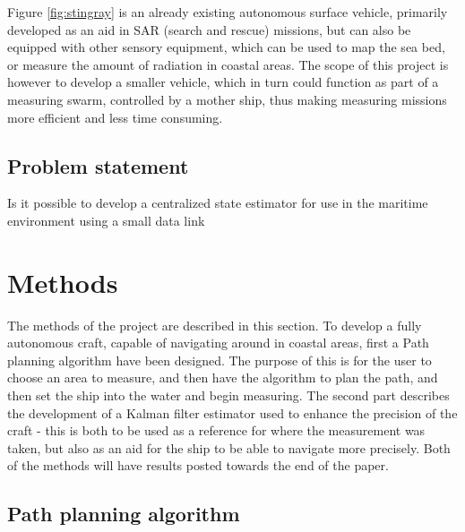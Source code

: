 \documentclass{ifacconf}
\begin{document}
Figure \ref{fig:stingray} is an already existing autonomous surface vehicle, primarily developed as an aid in SAR (search and rescue) missions, but can also be equipped with other sensory equipment, which can be used to map the sea bed, or measure the amount of radiation in coastal areas. The scope of this project is however to develop a smaller vehicle, which in turn could function as part of a measuring swarm, controlled by a mother ship, thus making measuring missions more efficient and less time consuming.

\subsection{Problem statement}
\begin{hypo} Is it possible to develop a centralized state estimator for use in the maritime environment using a small data link \end{hypo}

\section{Methods}

The methods of the project are described in this section. To develop a fully autonomous craft, capable of navigating around in coastal areas, first a Path planning algorithm have been designed. The purpose of this is for the user to choose an area to measure, and then have the algorithm to plan the path, and then set the ship into the water and begin measuring. The second part describes the development of a Kalman filter estimator used to enhance the precision of the craft - this is both to be used as a reference for where the measurement was taken, but also as an aid for the ship to be able to navigate more precisely. Both of the methods will have results posted towards the end of the paper. 

\subsection{Path planning algorithm}
\end{document}
